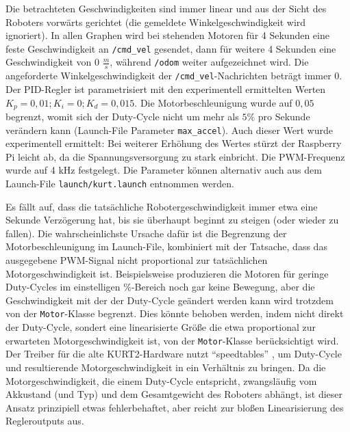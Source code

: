 \documentclass[german]{thesis_KBS}
\newcommand{\code}[1]{\texttt{#1}}  %
\begin{document}
Die betrachteten Geschwindigkeiten sind immer linear und aus der Sicht des
Roboters vorwärts gerichtet (die gemeldete Winkelgeschwindigkeit wird
ignoriert). In allen Graphen wird bei stehenden Motoren für 4 Sekunden eine
feste Geschwindigkeit an \code{/cmd\_vel} gesendet, dann für weitere 4 Sekunden
eine Geschwindigkeit von 0 $\frac{m}{s}$, während \code{/odom} weiter
aufgezeichnet wird. Die angeforderte Winkelgeschwindigkeit der
\code{/cmd\_vel}-Nachrichten beträgt immer 0. Der PID-Regler ist parametrisiert
mit den experimentell ermittelten Werten $K_p = 0,01; K_i = 0; K_d = 0,015$. Die
Motorbeschleunigung wurde auf $0,05$ begrenzt, womit sich der Duty-Cycle nicht
um mehr als $5\%$ pro Sekunde verändern kann (Launch-File Parameter
\code{max\_accel}). Auch dieser Wert wurde experimentell ermittelt: Bei weiterer
Erhöhung des Wertes stürzt der Raspberry Pi leicht ab, da die
Spannungsversorgung zu stark einbricht. Die PWM-Frequenz wurde auf 4 kHz
festgelegt. Die Parameter können alternativ auch aus dem Launch-File
\code{launch/kurt.launch} entnommen werden.

Es fällt auf, dass die tatsächliche Robotergeschwindigkeit immer etwa eine
Sekunde Verzögerung hat, bis sie überhaupt beginnt zu steigen (oder wieder zu
fallen). Die wahrscheinlichste Ursache dafür ist die Begrenzung der
Motorbeschleunigung im Launch-File, kombiniert mit der Tatsache, dass das
ausgegebene PWM-Signal nicht proportional zur tatsächlichen Motorgeschwindigkeit
ist. Beispielsweise produzieren die Motoren für geringe Duty-Cycles im
einstelligen \%-Bereich noch gar keine Bewegung, aber die Geschwindigkeit mit
der der Duty-Cycle geändert werden kann wird trotzdem von der
\code{Motor}-Klasse begrenzt. Dies könnte behoben werden, indem nicht direkt der
Duty-Cycle, sondert eine linearisierte Größe die etwa proportional zur
erwarteten Motorgeschwindigkeit ist, von der \code{Motor}-Klasse berücksichtigt
wird. Der Treiber für die alte KURT2-Hardware nutzt "`speedtables"'
\cite{old-sw-speedtable}, um Duty-Cycle und resultierende Motorgeschwindigkeit
in ein Verhältnis zu bringen. Da die Motorgeschwindigkeit, die einem Duty-Cycle
entspricht, zwangsläufig vom Akkustand (und Typ) und dem Gesamtgewicht des
Roboters abhängt, ist dieser Ansatz prinzipiell etwas fehlerbehaftet, aber
reicht zur bloßen Linearisierung des Regleroutputs aus.
\end{document}

